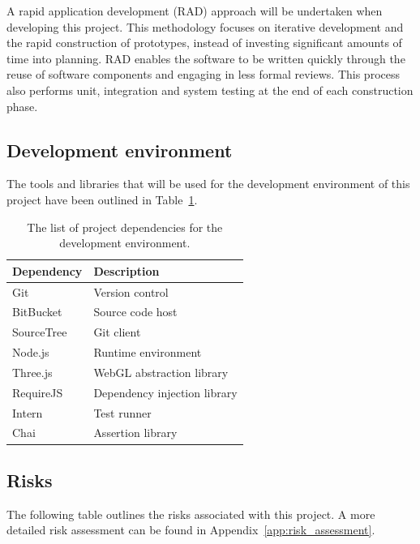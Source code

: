 \documentclass[
	fontsize=11pt
	headlines=2,
	footlines=2,
	parskip=half
]{scrartcl}
\begin{document}
{{			A rapid application development (RAD) approach will be undertaken when developing this project. This methodology focuses on iterative development and the rapid construction of prototypes, instead of investing significant amounts of time into planning. RAD enables the software to be written quickly through the reuse of software components and engaging in less formal reviews. This process also performs unit, integration and system testing at the end of each construction phase. 

		}
		
		\subsection{Development environment} {
		\label{sec:development_environment}

			The tools and libraries that will be used for the development environment of this project have been outlined in Table~\ref{tab:dependencies}.
		
			\begin{table}[H]
			\caption{The list of project dependencies for the development environment.}
			\label{tab:dependencies}
			\begin{tabularx}{\textwidth}{@{}XX@{}}
				\toprule
				\textbf{Dependency} & \textbf{Description} \\
				\midrule
				Git & Version control \\
				BitBucket & Source code host \\
				SourceTree & Git client \\
				Node.js & Runtime environment \\
				Three.js & WebGL abstraction library \\
				RequireJS & Dependency injection library \\
				Intern & Test runner \\
				Chai & Assertion library \\
				\bottomrule
			\end{tabularx}
			\end{table}
		
		}
		
		\subsection{Risks} {
		\label{sec:risks}

			The following table outlines the risks associated with this project. A more detailed risk assessment can be found in Appendix~\ref{app:risk_assessment}.
			
}}
\end{document}
